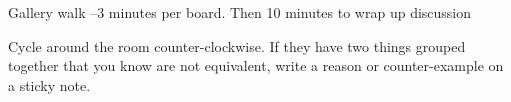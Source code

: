 \begin{applicationActivities}{3}{19}
\begin{activity}{25}
\begin{TBLnote}Gallery walk --3 minutes per board.  Then 10 minutes to wrap up discussion \end{TBLnote}
Cycle around the room counter-clockwise.  If they have two things grouped together that you know are not equivalent, write a reason or counter-example on a sticky note.
\end{activity}


\end{applicationActivities}
